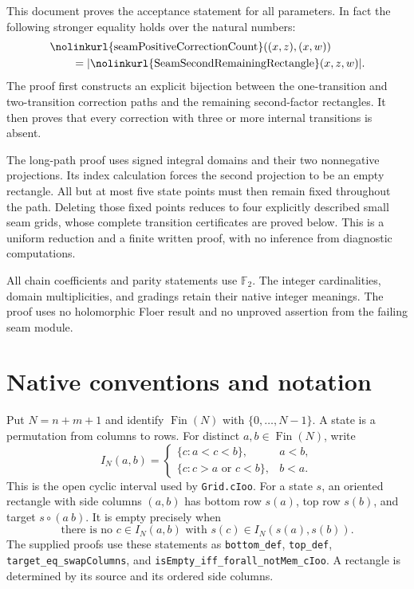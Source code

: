 \documentclass[11pt,oneside]{report}
\theoremstyle{definition}
\numberwithin{equation}{section}
\newcommand{\F}{\mathbb F_2}
\newcommand{\decl}[1]{\textnormal{\nolinkurl{#1}}}
\newcommand{\seamcard}[1]{\lvert #1\rvert}
\begin{document}
This document proves the acceptance statement for all parameters.
In fact the following stronger equality holds over the natural numbers:
\begin{equation}\label{J06:eq:integer}
 \begin{aligned}
 &\decl{seamPositiveCorrectionCount}((x,z),(x,w))\\
 &\qquad=\seamcard{\decl{SeamSecondRemainingRectangle}(x,z,w)}.
 \end{aligned}
\end{equation}
The proof first constructs an explicit bijection between the one-transition
and two-transition correction paths and the remaining second-factor
rectangles. It then proves that every correction with three or more
internal transitions is absent.

The long-path proof uses signed integral domains and their two
nonnegative projections. Its index calculation forces the second
projection to be an empty rectangle. All but at most five state points
must then remain fixed throughout the path. Deleting those fixed points
reduces to four explicitly described small seam grids, whose complete
transition certificates are proved below. This is a uniform reduction
and a finite written proof, with no inference from diagnostic computations.

All chain coefficients and parity statements use $\F$. The integer
cardinalities, domain multiplicities, and gradings retain their native
integer meanings. The proof uses no holomorphic Floer result and no
unproved assertion from the failing seam module.

\section{Native conventions and notation}

Put $N=n+m+1$ and identify $\operatorname{Fin}(N)$ with
$\{0,\ldots,N-1\}$. A state is a permutation from columns to rows.
For distinct $a,b\in\operatorname{Fin}(N)$, write
\[
 I_N(a,b)=
 \begin{cases}
  \{c:a<c<b\},&a<b,\\
  \{c:c>a\text{ or }c<b\},&b<a.
 \end{cases}
\]
This is the open cyclic interval used by \decl{Grid.cIoo}. For a state $s$,
an oriented rectangle with side columns $(a,b)$ has bottom row $s(a)$,
top row $s(b)$, and target $s\circ(a\ b)$. It is empty precisely when
\begin{equation}\label{J06:eq:empty}
 \text{there is no }c\in I_N(a,b)\text{ with }s(c)\in I_N(s(a),s(b)).
\end{equation}
The supplied proofs use these statements as
\decl{bottom_def}, \decl{top_def}, \decl{target_eq_swapColumns}, and
\decl{isEmpty_iff_forall_notMem_cIoo}.
A rectangle is determined by its source and its ordered side columns.
\end{document}
